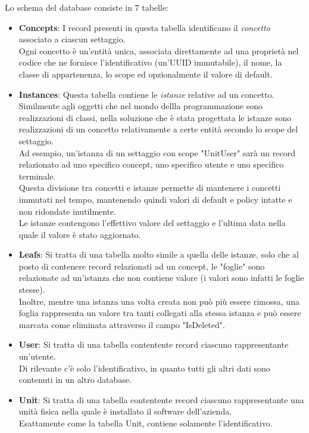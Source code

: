 \documentclass[\main/tesi.tex]{subfiles}
\begin{document}
Lo schema del database consiste in 7 tabelle:
\begin{itemize}
    \item \textbf{Concepts}: I record presenti in questa tabella identificano il \textit{concetto} associato a ciascun settaggio.\\Ogni concetto è un'entità unica, associata direttamente ad una proprietà nel codice che ne fornisce l'identificativo (un'UUID immutabile), il nome, la classe di appartenenza, lo scope ed opzionalmente il valore di default.
    \item \textbf{Instances}: Questa tabella contiene le \textit{istanze} relative ad un concetto.\\Similmente agli oggetti che nel mondo dellla programmazione sono realizzazioni di classi, nella soluzione che è stata progettata le istanze sono realizzazioni di un concetto relativamente a certe entità secondo lo scope del settaggio.\\Ad esempio, un'istanza di un settaggio con scope "UnitUser" sarà un record relazionato ad uno specifico concept, uno specifico utente e uno specifico terminale.\\Questa divisione tra concetti e istanze permette di mantenere i concetti immutati nel tempo, mantenendo quindi valori di default e policy intatte e non ridondate inutilmente.\\Le istanze contengono l'effettivo valore del settaggio e l'ultima data nella quale il valore è stato aggiornato.
    \item \textbf{Leafs}: Si tratta di una tabella molto simile a quella delle istanze, solo che al posto di contenere record relazionati ad un concept, le "foglie" sono relazionate ad un'istanza che non contiene valore (i valori sono infatti le foglie stesse).\\Inoltre, mentre una istanza una volta creata non può più essere rimossa, una foglia rappresenta un valore tra tanti collegati alla stessa istanza e può essere marcata come eliminata attraverso il campo "IsDeleted".
    \item \textbf{User}: Si tratta di una tabella contentente record ciascuno rappresentante un'utente.\\Di rilevante c'è solo l'identificativo, in quanto tutti gli altri dati sono contenuti in un altro database.
    \item \textbf{Unit}: Si tratta di una tabella contentente record ciascuno rappresentante una unità fisica nella quale è installato il software dell'azienda.\\Esattamente come la tabella Unit, contiene solamente l'identificativo.

\end{itemize}
\end{document}
